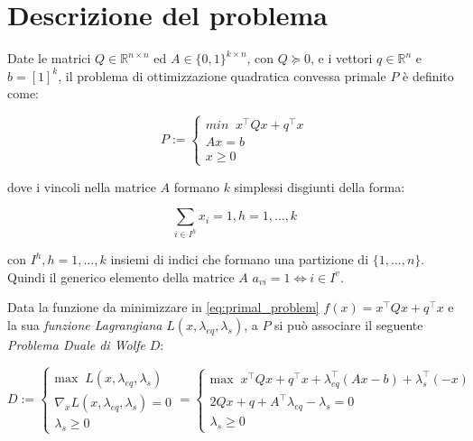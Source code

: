 \section{Descrizione del problema}

Date le matrici $Q \in \mathbb{R}^{n \times n}$ ed $A \in \lbrace0, 1\rbrace^{k\times n}$, con $Q\succeq 0$, e i vettori $q\in\mathbb{R}^n$ e $b=[1]^k$, il problema di ottimizzazione quadratica convessa primale $P$ è definito come:

\begin{equation} \label{eq:primal_problem}
P := \begin{cases} {min }\;\; x^\intercal Qx+q^\intercal x \\ Ax=b \\x\geq 0\end{cases}
\end{equation}

dove i vincoli nella matrice $A$ formano $k$ simplessi disgiunti della forma:

\begin{equation} \label{eq:vincoli}
\sum_{i \in I^h} x_i = 1, h = 1, \dots, k
\end{equation}

con $I^h, h = 1, \dots, k$ insiemi di indici che formano una partizione di $\{1,\dots,n\}$. Quindi il generico elemento della matrice $A$ $a_{vi} = 1 \Longleftrightarrow i \in I^v$.

Data la funzione da minimizzare in \ref{eq:primal_problem} $f(x) = x^\intercal Qx +q^\intercal x$ e la sua \emph{funzione Lagrangiana} $L(x,\lambda_{eq}, \lambda_s)$, a $P$ si può associare il seguente \emph{Problema Duale di Wolfe} $D$:

\begin{equation} \label{eq:dual_problem}
D := \begin{cases}\mathrm{max} \;\; L(x,\lambda_{eq},\lambda_s)\\
\nabla _x L(x, \lambda_{eq}, \lambda_s) = 0 \\
\lambda_s \geq 0
\end{cases}
= 
\begin{cases} \mathrm{max}\;\;  x^\intercal Qx +q^\intercal x + \lambda^\intercal_{eq}(Ax - b) +\lambda^\intercal_s(-x)\\
2Qx + q + A^\intercal \lambda_{eq} -\lambda_s= 0 \\
\lambda_s \geq 0
\end{cases}
\end{equation}

